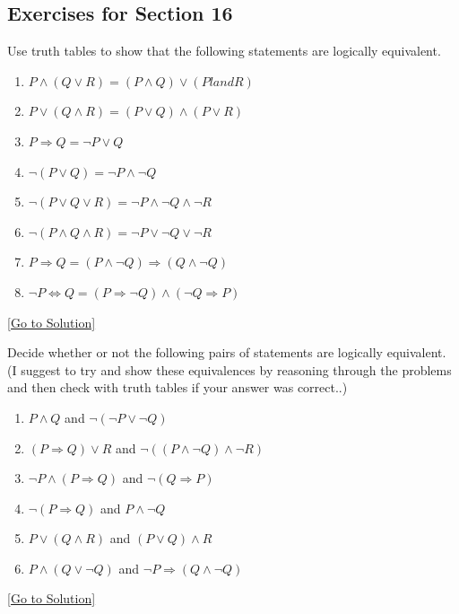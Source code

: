 \subsection{Exercises for Section 16}

\begin{exercise}\label{ex:2.16.1}
    Use truth tables to show that the following statements are logically equivalent. 
    \begin{enumerate}
        \item $P\land (Q\lor R) = (P\land Q)\lor (Pland R)$
        \item $P\lor(Q\land R)=(P\lor Q)\land(P\lor R)$
        \item $P\Rightarrow Q = \neg P\lor Q$
        \item $\neg(P\lor Q)=\neg P\land \neg Q$
        \item $\neg (P\lor Q\lor R)=\neg P\land \neg Q \land \neg R$
        \item $\neg (P\land Q\land R)= \neg P\lor \neg Q\lor \neg R$
        \item $P\Rightarrow Q = (P\land \neg Q)\Rightarrow (Q\land \neg Q)$
        \item $\neg P\Leftrightarrow Q = (P\Rightarrow\neg Q)\land (\neg Q\Rightarrow P)$
    \end{enumerate}
\end{exercise}\hyperref[sol:2.16.1]{[Go to Solution]}

\begin{exercise}\label{ex:2.16.2}
    Decide whether or not the following pairs of statements are logically equivalent. (I suggest to try and show these equivalences by reasoning through the problems and then check with truth tables if your answer was correct..)
    \begin{enumerate}
        \item $P\land Q$ and $\neg(\neg P\lor \neg Q)$
        \item $(P\Rightarrow Q)\lor R$ and $\neg((P\land \neg Q)\land \neg R)$
        \item $\neg P\land (P\Rightarrow Q)$ and $\neg(Q\Rightarrow P)$
        \item $\neg (P\Rightarrow Q)$ and $P\land \neg Q$
        \item $P\lor (Q\land R)$ and $(P\lor Q)\land R$
        \item $P\land (Q\lor \neg Q)$ and $\neg P\Rightarrow (Q\land\neg Q)$
    \end{enumerate}
\end{exercise}\hyperref[sol:2.16.2]{[Go to Solution]}